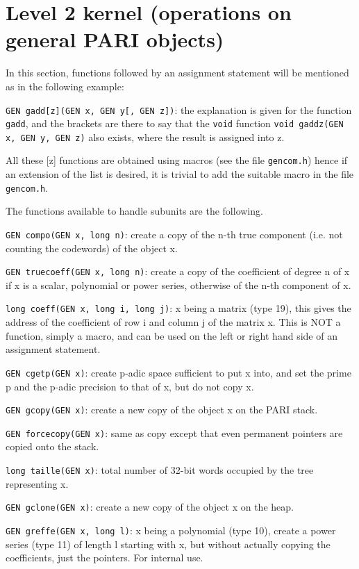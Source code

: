 \section{Level 2 kernel (operations on general PARI objects)}

In this section, functions followed by an assignment statement will be 
mentioned as in the following example:

{\tt GEN gadd[z](GEN x, GEN y[, GEN z])}: the explanation is given for
the function {\tt gadd}, and the brackets are there to say
that the {\tt void} function {\tt void gaddz(GEN x, GEN y, GEN z)} also
exists, where the result is assigned into z.

All these [z] functions are obtained using macros (see the file {\tt gencom.h})
hence if an extension of the list is desired, it is trivial to add the
suitable macro in the file {\tt gencom.h}.

The functions available to handle subunits are the following.

{\tt GEN compo(GEN x, long n)}: create a copy of the n-th true component (i.e.
not counting the codewords) of the object x.

{\tt GEN truecoeff(GEN x, long n)}: create a copy of the coefficient of degree
n of x if x is a scalar, polynomial or power series, otherwise of the n-th
component of x.

{\tt long coeff(GEN x, long i, long j)}: x being a matrix (type 19), this gives
the address of the coefficient of row i and column j of the matrix x. This is
NOT a function, simply a macro, and can be used on the left or right hand side
of an assignment statement.


{\tt GEN cgetp(GEN x)}: create p-adic space sufficient to put x into, and
set the prime p and the p-adic precision to that of x, but do not copy x.

{\tt GEN gcopy(GEN x)}: create a new copy of the object x on the PARI stack.

{\tt GEN forcecopy(GEN x)}: same as copy except that even permanent pointers
are copied onto the stack.

{\tt long taille(GEN x)}: total number of 32-bit words occupied by the tree
representing x.

{\tt GEN gclone(GEN x)}: create a new copy of the object x on the heap.

{\tt GEN greffe(GEN x, long l)}: x being a polynomial (type 10), create a
power series (type 11) of length l starting with x, but without actually
copying the coefficients, just the pointers. For internal use.

